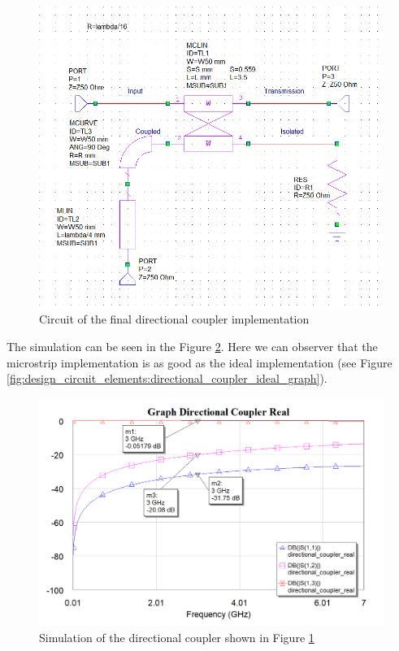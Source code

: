 \documentclass[12pt]{report} %
\begin{document}
\begin{figure}[htbp]
    \centering
    \includegraphics[width=1\linewidth]{images//microstrip_elements/directional_coupler_real_circuit.png}
    \caption{Circuit of the final directional coupler implementation}
    \label{fig:microstrip_elements:directional_coupler_real_circuit}
\end{figure}

The simulation can be seen in the Figure \ref{fig:microstrip_elements:directional_coupler_real_graph}. Here we can observer that the microstrip implementation is as good as the ideal implementation (see Figure \ref{fig:design_circuit_elements:directional_coupler_ideal_graph}).

\begin{figure}
    \centering
    \includegraphics[width=1\linewidth]{images//microstrip_elements/directional_coupler_real_graph.png}
    \caption{Simulation of the directional coupler shown in Figure \ref{fig:microstrip_elements:directional_coupler_real_circuit}}
    \label{fig:microstrip_elements:directional_coupler_real_graph}
\end{figure}
\end{document}

